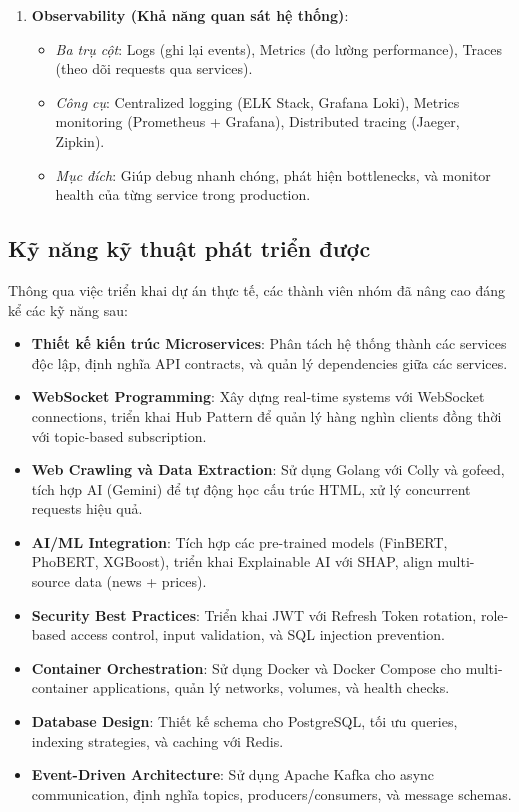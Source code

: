 \begin{enumerate}
    \item \textbf{Observability (Khả năng quan sát hệ thống)}:
    \begin{itemize}
        \item \textit{Ba trụ cột}: Logs (ghi lại events), Metrics (đo lường performance), Traces (theo dõi requests qua services).
        \item \textit{Công cụ}: Centralized logging (ELK Stack, Grafana Loki), Metrics monitoring (Prometheus + Grafana), Distributed tracing (Jaeger, Zipkin).
        \item \textit{Mục đích}: Giúp debug nhanh chóng, phát hiện bottlenecks, và monitor health của từng service trong production.
    \end{itemize}
\end{enumerate}

\subsection{Kỹ năng kỹ thuật phát triển được}

Thông qua việc triển khai dự án thực tế, các thành viên nhóm đã nâng cao đáng kể các kỹ năng sau:

\begin{itemize}
    \item \textbf{Thiết kế kiến trúc Microservices}: Phân tách hệ thống thành các services độc lập, định nghĩa API contracts, và quản lý dependencies giữa các services.
    
    \item \textbf{WebSocket Programming}: Xây dựng real-time systems với WebSocket connections, triển khai Hub Pattern để quản lý hàng nghìn clients đồng thời với topic-based subscription.
    
    \item \textbf{Web Crawling và Data Extraction}: Sử dụng Golang với Colly và gofeed, tích hợp AI (Gemini) để tự động học cấu trúc HTML, xử lý concurrent requests hiệu quả.
    
    \item \textbf{AI/ML Integration}: Tích hợp các pre-trained models (FinBERT, PhoBERT, XGBoost), triển khai Explainable AI với SHAP, align multi-source data (news + prices).
    
    \item \textbf{Security Best Practices}: Triển khai JWT với Refresh Token rotation, role-based access control, input validation, và SQL injection prevention.
    
    \item \textbf{Container Orchestration}: Sử dụng Docker và Docker Compose cho multi-container applications, quản lý networks, volumes, và health checks.
    
    \item \textbf{Database Design}: Thiết kế schema cho PostgreSQL, tối ưu queries, indexing strategies, và caching với Redis.
    
    \item \textbf{Event-Driven Architecture}: Sử dụng Apache Kafka cho async communication, định nghĩa topics, producers/consumers, và message schemas.
\end{itemize}

